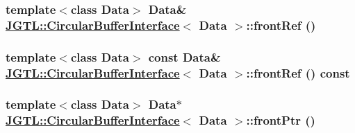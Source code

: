 \hypertarget{class_j_g_t_l_1_1_circular_buffer_interface_6d5f296bf6f8a83d6c778d0dc67c119c}{
\subsubsection[frontRef]{\setlength{\rightskip}{0pt plus 5cm}template$<$class Data$>$ Data\& \hyperlink{class_j_g_t_l_1_1_circular_buffer_interface}{JGTL::Circular\-Buffer\-Interface}$<$ Data $>$::front\-Ref ()}}
\label{class_j_g_t_l_1_1_circular_buffer_interface_6d5f296bf6f8a83d6c778d0dc67c119c}


\hypertarget{class_j_g_t_l_1_1_circular_buffer_interface_b489be5b2b397fa2c17d804861787a90}{
\subsubsection[frontRef]{\setlength{\rightskip}{0pt plus 5cm}template$<$class Data$>$ const Data\& \hyperlink{class_j_g_t_l_1_1_circular_buffer_interface}{JGTL::Circular\-Buffer\-Interface}$<$ Data $>$::front\-Ref () const}}
\label{class_j_g_t_l_1_1_circular_buffer_interface_b489be5b2b397fa2c17d804861787a90}


\hypertarget{class_j_g_t_l_1_1_circular_buffer_interface_f2d1a7a2aa153a637f09af061c94faab}{
\subsubsection[frontPtr]{\setlength{\rightskip}{0pt plus 5cm}template$<$class Data$>$ Data$\ast$ \hyperlink{class_j_g_t_l_1_1_circular_buffer_interface}{JGTL::Circular\-Buffer\-Interface}$<$ Data $>$::front\-Ptr ()}}
\label{class_j_g_t_l_1_1_circular_buffer_interface_f2d1a7a2aa153a637f09af061c94faab}


